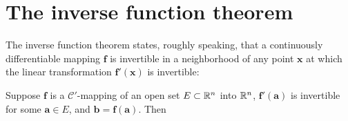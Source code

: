 \section{The inverse function theorem}

The inverse function theorem states, roughly speaking, that a continuously
differentiable mapping $\mathbf{f}$ is invertible in a neighborhood of any point $\mathbf{x}$ at which
the linear transformation $\mathbf{f'(x)}$ is invertible:

\begin{thm}
    \label{thm:9.24}
    Suppose $\mathbf{f}$ is a $\mathscr{C}'$-mapping of an open set $E \subset {\protect\mathbb R}^n$ into ${\protect\mathbb R}^n$, 
    $\mathbf{f'(a)}$ is invertible for some $\mathbf{a} \in E$, 
    and $\mathbf{b = f(a)}$. Then
\end{thm}

\begin{thm}
    \label{thm:9.25}
\end{thm}